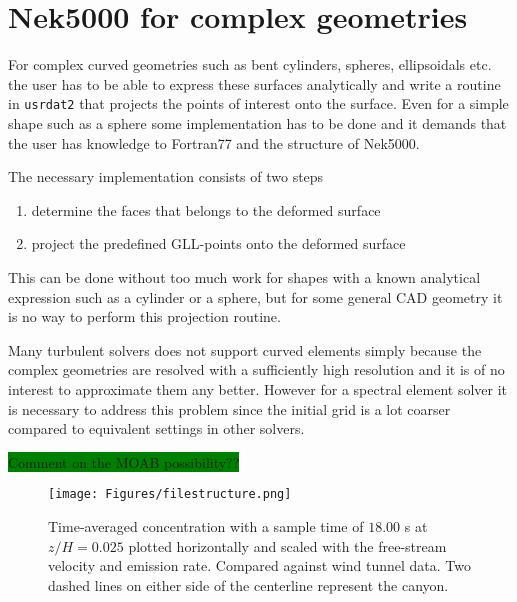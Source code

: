 \section{Nek5000 for complex geometries}
For complex curved geometries such as bent cylinders, spheres, ellipsoidals etc.
the user has to be able to express these surfaces analytically and write a routine
in \verb|usrdat2| that projects the points of interest onto the surface.
Even for a simple shape such as a sphere some implementation has to be done and it 
demands that the user has knowledge to Fortran77 and the structure of Nek5000.

The necessary implementation consists of two steps 
%
\begin{enumerate}
    \item determine the faces that belongs to the deformed surface
    \item project the predefined GLL-points onto the deformed surface
\end{enumerate}
%
This can be done without too much work for shapes with a known analytical 
expression such as a cylinder or a sphere, but for some general CAD geometry 
it is no way to perform this projection routine. 

Many turbulent solvers does not support curved elements simply because the 
complex geometries are resolved with a sufficiently high resolution and it 
is of no interest to approximate them any better. However for a spectral element
solver it is necessary to address this problem since the initial grid is a lot coarser
compared to equivalent settings in other solvers.

\colorbox{green}{Comment on the MOAB possibility??}


%
\begin{figure}[h]
	\centering
	\texttt{[image: Figures/filestructure.png]}
	\caption{Time-averaged concentration with a sample time of $18.00$ s at $z/H = 0.025$ plotted horizontally and scaled 
	with the free-stream velocity and emission rate. Compared against wind tunnel data.
Two dashed lines on either side of the centerline represent the canyon.}
	\label{fig:cHfilter}
\end{figure}
%
